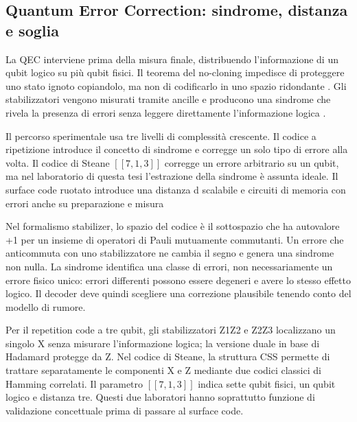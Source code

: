 \subsection{Quantum Error Correction: sindrome, distanza e soglia}\label{sec:finale_3_4_2}

La QEC interviene prima della misura finale, distribuendo l'informazione di un qubit logico su più qubit fisici. Il teorema del no-cloning impedisce di proteggere uno stato ignoto copiandolo, ma non di codificarlo in uno spazio ridondante \cite{wootters1982}. Gli stabilizzatori vengono misurati tramite ancille e producono una sindrome che rivela la presenza di errori senza leggere direttamente l'informazione logica \cite{steane1996,shorcorrection1995,aharonov1997fault,calderbankShor1996,gottesman1997}.

Il percorso sperimentale usa tre livelli di complessità crescente. Il codice a ripetizione introduce il concetto di sindrome e corregge un solo tipo di errore alla volta. Il codice di Steane \ensuremath{[[7,1,3]]} corregge un errore arbitrario su un qubit, ma nel laboratorio di questa tesi l'estrazione della sindrome è assunta ideale. Il surface code ruotato introduce una distanza d scalabile e circuiti di memoria con errori anche su preparazione e misura \cite{steane1996,fowler2012,googleQECBelowThreshold2025,googleSurfaceCode2023,dennis2002topological,calderbankShor1996,gottesman1997}

Nel formalismo stabilizer, lo spazio del codice è il sottospazio che ha autovalore +1 per un insieme di operatori di Pauli mutuamente commutanti. Un errore che anticommuta con uno stabilizzatore ne cambia il segno e genera una sindrome non nulla. La sindrome identifica una classe di errori, non necessariamente un errore fisico unico: errori differenti possono essere degeneri e avere lo stesso effetto logico. Il decoder deve quindi scegliere una correzione plausibile tenendo conto del modello di rumore.

Per il repetition code a tre qubit, gli stabilizzatori Z1Z2 e Z2Z3 localizzano un singolo X senza misurare l'informazione logica; la versione duale in base di Hadamard protegge da Z. Nel codice di Steane, la struttura CSS permette di trattare separatamente le componenti X e Z mediante due codici classici di Hamming correlati. Il parametro \ensuremath{[[7,1,3]]} indica sette qubit fisici, un qubit logico e distanza tre. Questi due laboratori hanno soprattutto funzione di validazione concettuale prima di passare al surface code.


